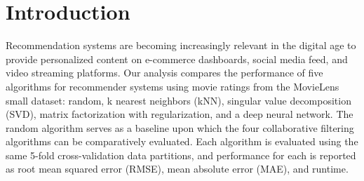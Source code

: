 \section{Introduction}

Recommendation systems are becoming increasingly relevant in the digital age to provide personalized content on e-commerce dashboards, social media feed, and video 
streaming platforms. Our analysis compares the performance of five algorithms for recommender systems using movie ratings from the MovieLens small dataset: random, k nearest neighbors (kNN),
singular value decomposition (SVD), matrix factorization with regularization, and a deep neural network. The random algorithm serves as a baseline upon which the four collaborative
filtering algorithms can be comparatively evaluated. Each algorithm is evaluated using the same 5-fold cross-validation data partitions, and performance for each is reported as root
mean squared error (RMSE), mean absolute error (MAE), and runtime.